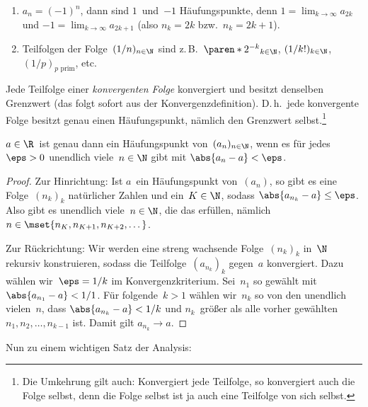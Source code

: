 \documentclass[a4paper]{article}
\begin{document}
\begin{example}\leavevmode
    \begin{enumerate}
        \item $a_n = (-1)^n$, dann sind $1$~und~$-1$ Häufungspunkte, denn $1 = \lim_{k\to\infty} a_{2k}$ und $-1 = \lim_{k\to\infty} a_{2k+1}$ (also $n_k = 2k$ bzw.\ $n_k = 2k+1$).
        \item Teilfolgen der Folge~$(1/n)_{n\in\N}$ sind z.\,B.\ $\paren*{2^{-k}}_{k\in\N}$, $(1/k!)_{k\in\N}$, $(1/p)_{p\text{ prim}}$, etc.
    \end{enumerate}
\end{example}

\begin{remark}
    Jede Teilfolge einer \emph{konvergenten Folge} konvergiert und besitzt denselben Grenzwert (das folgt sofort aus der Konvergenzdefinition). D.\,h.\ jede konvergente Folge besitzt genau einen Häufungspunkt, nämlich den Grenzwert selbst.\footnote{Die Umkehrung gilt auch: Konvergiert jede Teilfolge, so konvergiert auch die Folge selbst, denn die Folge selbst ist ja auch eine Teilfolge von sich selbst.}
\end{remark}

\begin{lemma}
    $a \in \R$~ist genau dann ein Häufungspunkt von~$(a_n)_{n\in\N}$, wenn es für jedes~$\eps > 0$ unendlich viele~$n \in \N$ gibt mit $\abs{a_n-a} < \eps$.
\end{lemma}

\begin{proof}
    Zur Hinrichtung: Ist $a$~ein Häufungspunkt von~$(a_n)$, so gibt es eine Folge~$(n_k)_k$ natürlicher Zahlen und ein~$K \in \N$, sodass $\abs{a_{n_k}-a} \leq \eps$. Also gibt es unendlich viele~$n \in \N$, die das erfüllen, nämlich $n \in \mset{n_K, n_{K+1}, n_{K+2}, \dots}$.

    Zur Rückrichtung: Wir werden eine streng wachsende Folge~$(n_k)_k$ in~$\N$ rekursiv konstruieren, sodass die Teilfolge~$(a_{n_k})_k$ gegen~$a$ konvergiert. Dazu wählen wir~$\eps = 1/k$ im Konvergenzkriterium. Sei~$n_1$ so gewählt mit $\abs{a_{n_1}-a} < 1/1$. Für folgende~$k > 1$ wählen wir~$n_k$ so von den unendlich vielen~$n$, dass $\abs{a_{n_k}-a} < 1/k$ und $n_k$~größer als alle vorher gewählten $n_1, n_2, \dots, n_{k-1}$ ist. Damit gilt $a_{n_k} \to a$.
\end{proof}

Nun zu einem wichtigen Satz der Analysis:
\end{document}
